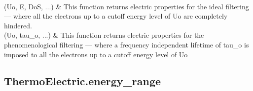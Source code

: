 \documentclass[letterpaper,10pt,english]{sphinxmanual}
\begin{document}
\begin{savenotes}
\begin{longtable}[c]{}
\\
\hline
\sphinxAtStartPar
{\hyperref[\detokenize{autosummary/ThermoElectric.filtering_effect:ThermoElectric.filtering_effect}]{}}(Uo, E, DoS, ...)
&
\sphinxAtStartPar
This function returns electric properties for the ideal filtering —  where all the electrons up to a cutoff energy level of Uo are completely hindered.
\\
\hline
\sphinxAtStartPar
{\hyperref[\detokenize{autosummary/ThermoElectric.phenomenological:ThermoElectric.phenomenological}]{}}(Uo, tau\_o, ...)
&
\sphinxAtStartPar
This function returns electric properties for the phenomenological filtering —  where a frequency independent lifetime of tau\_o is imposed to all the electrons up to a cutoff energy level of Uo
\\
\hline
\end{longtable}\sphinxatlongtableend\end{savenotes}


\subsection{ThermoElectric.energy\_range}
\label{\detokenize{autosummary/ThermoElectric.energy_range:thermoelectric-energy-range}}\label{\detokenize{autosummary/ThermoElectric.energy_range::doc}}
\end{document}
